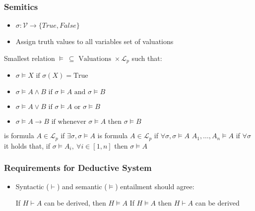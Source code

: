 \subsubsection{Semitics}
\begin{itemize}
        \begin{itemize}
            \item $\sigma: \mathcal{V} \to \{True, False\}$
            \item Assign truth values to all variables
             set of valuations
        \end{itemize}
     Smallest relation $\models \ \subseteq \text{ Valuations } \times \mathcal{L}_p$ such that:
        \begin{itemize}
            \item $\sigma \models X \text{ if } \sigma(X) = \text{True}$
            \item $\sigma \models A \wedge B \text{ if } \sigma \models A \text{ and } \sigma \models B$
            \item $\sigma \models A \vee B \text{ if } \sigma \models A \text{ or } \sigma \models B$
            \item $\sigma \models A \to B \text{ if whenever } \sigma \models A \text{ then } \sigma \models B$
        \end{itemize}
     is formula $A \in \mathcal{L}_p$ if $\exists \sigma, \sigma \models A$
     is formula $A \in \mathcal{L}_p$ if $\forall \sigma, \sigma \models A$
     $A_1, \dots , A_n \models A$ if $\forall \sigma$ it holds that, if $\sigma \models A_i, \ \forall i \in [1, n]$ then $\sigma \models A$
\end{itemize}

\subsubsection{Requirements for Deductive System}
\begin{itemize}
    \item Syntactic ($\vdash$) and semantic ($\models$) entailment should agree:
        \begin{itemize}
             If $H \vdash A$ can be derived, then $H \models A$
             If $H \models A$ then $H \vdash A$ can be derived
        \end{itemize}
\end{itemize}


